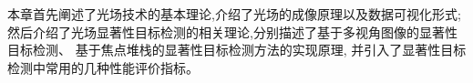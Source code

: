 






本章首先阐述了光场技术的基本理论,介绍了光场的成像原理以及数据可视化形式;
然后介绍了光场显著性目标检测的相关理论,分别描述了基于多视角图像的显著性目标检测、
基于焦点堆栈的显著性目标检测方法的实现原理,
并引入了显著性目标检测中常用的几种性能评价指标。